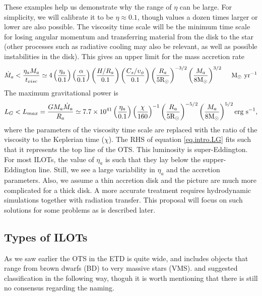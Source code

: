 \documentclass[modern]{aastex62}
\newcommand{\Rsun}{\mathrm{R}_\odot}
\newcommand{\Msun}{\mathrm{M}_\odot}
\def \msyr{~\rm{M_{\odot}}~\rm{yr^{-1}}}
\begin{document}
These examples help us demonstrate why the range of $\eta$ can be large.
For simplicity, we will calibrate it to be $\eta \approx 0.1$, though values a dozen times larger or lower are also possible.
The viscosity time scale will be the minimum time scale for losing angular momentum and transferring material from the disk to the star (other processes such as radiative cooling may also be relevant, as well as possible instabilities in the disk). This gives an upper limit for the mass accretion rate
\begin{equation}
\dot M_a < \frac{\eta_a M_a}{t_{visc}} \simeq 4\left(\frac{\eta_a}{0.1}\right) \left(\frac{\alpha}{0.1}\right) \left(\frac{H/R_a}{0.1}\right) \left(\frac{C_s/\upsilon_\phi}{0.1}\right) \left(\frac{R_a}{5\Rsun}\right)^{-3/2} \left(\frac{M_a}{8\Msun}\right)^{3/2} \quad \msyr
\end{equation}
The maximum gravitational power is
\begin{equation}\label{eq.intro.LG}
L_G<L_{max} = \frac{GM_a\dot M_a}{R_a} \simeq 7.7 \times 10^{41}\left(\frac{\eta_a}{0.1}\right) \left(\frac{\chi}{160}\right)^{-1} \left(\frac{R_a}{5 \Rsun}\right)^{-5/2} \left( \frac{M_a}{8 \Msun}\right)^{5/2} \text{erg}~\rm{s^{-1}},
\end{equation}
where the parameters of the viscosity time scale are replaced with the ratio of the viscosity to the Keplerian time ($\chi$). 
The RHS of equation \ref{eq.intro.LG} fits such that it represents the top line of the OTS.
This luminosity is super-Eddington. 
For most ILOTs, the value of $\eta_a$ is such that they lay below the supper-Eddington line. 
Still, we see a large variability in $\eta_a$ and the accretion parameters. 
Also, we assume a thin accretion disk and the picture are much more complicated for a thick disk. 
A more accurate treatment requires hydrodynamic simulations together with radiation transfer. 
This proposal will focus on such solutions for some problems as is described later. 

\subsection{Types of ILOTs \label{subsec:Types of ILOTs}}
As we saw earlier the OTS in the ETD is quite wide, and includes objects that range from brown dwarfs (BD) to very massive stars (VMS).
\cite{2016RAA....16...99K} and \cite{2018Galax...6...82K} suggested classification in the following way, thoguh it is worth mentioning that there is still no consensus regarding the naming.
\end{document}
